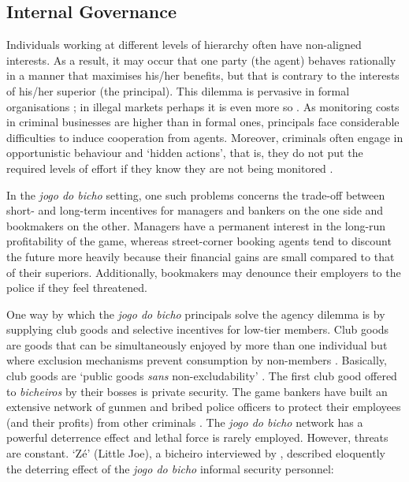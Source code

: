 \documentclass[a4paper,12pt]{article}
\begin{document}
\subsection{Internal Governance}
\label{sub:internal}

Individuals working at different levels of hierarchy often have non-aligned interests. As a result, it may occur that one party (the agent) behaves rationally in a manner that maximises his/her benefits, but that is contrary to the interests of his/her superior (the principal). This dilemma is pervasive in formal organisations \citep{holmstrom1979moral,jensen1976theory,moe1984new,shapiro2005agency,spence1971insurance}; in illegal markets perhaps it is even more so \citep{campana2013cooperation,gambetta2009codes,skarbek2011governance,skarbek2014social}. As monitoring costs in criminal businesses are higher than in formal ones, principals face considerable difficulties to induce cooperation from agents. Moreover, criminals often engage in opportunistic behaviour and `hidden actions', that is, they do not put the required levels of effort if they know they are not being monitored \citep[38--42]{arrow1985agency}.

In the \emph{jogo do bicho} setting, one such problems concerns the trade-off between short- and long-term incentives for managers and bankers on the one side and bookmakers on the other. Managers have a permanent interest in the long-run profitability of the game, whereas street-corner booking agents tend to discount the future more heavily because their financial gains are small compared to that of their superiors. Additionally, bookmakers may denounce their employers to the police if they feel threatened.

One way by which the \emph{jogo do bicho} principals solve the agency dilemma is by supplying club goods and selective incentives for low-tier members. Club goods are goods that can be simultaneously enjoyed by more than one individual but where exclusion mechanisms prevent consumption by non-members \citep{buchanan1965economic, cornes1996theory, olson1965logic, sandler1980economic, sandler1997club}. Basically, club goods are `public goods \emph{sans} non-excludability' \citep[928]{mcnutt1999public}. The first club good offered to \emph{bicheiros} by their bosses is private security. The game bankers have built an extensive network of gunmen and bribed police officers to protect their employees (and their profits) from other criminals \citetext{\citealp[48]{chinelli1993vazio}; \citealp[51]{labronici2012paratodos}}. The \emph{jogo do bicho} network has a powerful deterrence effect and lethal force is rarely employed. However, threats are constant. `Zé' (Little Joe), a bicheiro interviewed by \citet[52]{labronici2012paratodos}, described eloquently the deterring effect of the \emph{jogo do bicho} informal security personnel:
\end{document}
